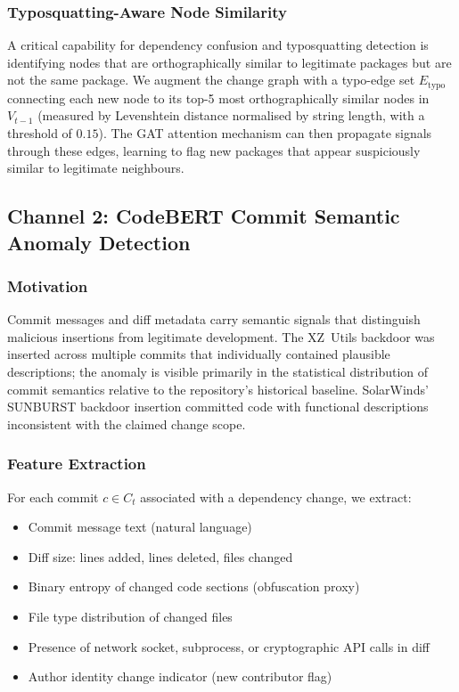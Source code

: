 \documentclass[sigconf,nonacm]{acmart}
\begin{document}
\subsubsection{Typosquatting-Aware Node Similarity}

A critical capability for dependency confusion and typosquatting detection is
identifying nodes that are orthographically similar to legitimate packages but
are not the same package. We augment the change graph with a typo-edge set
$E_\text{typo}$ connecting each new node to its top-5 most orthographically
similar nodes in $V_{t-1}$ (measured by Levenshtein distance normalised by
string length, with a threshold of $0.15$). The GAT attention mechanism can
then propagate signals through these edges, learning to flag new packages that
appear suspiciously similar to legitimate neighbours.

\subsection{Channel 2: CodeBERT Commit Semantic Anomaly Detection}

\subsubsection{Motivation}

Commit messages and diff metadata carry semantic signals that distinguish malicious
insertions from legitimate development. The XZ~Utils backdoor was inserted across
multiple commits that individually contained plausible descriptions; the anomaly
is visible primarily in the statistical distribution of commit semantics relative
to the repository's historical baseline. SolarWinds' SUNBURST backdoor insertion
committed code with functional descriptions inconsistent with the claimed change
scope.

\subsubsection{Feature Extraction}

For each commit $c \in C_t$ associated with a dependency change, we extract:
\begin{itemize}
  \item Commit message text (natural language)
  \item Diff size: lines added, lines deleted, files changed
  \item Binary entropy of changed code sections (obfuscation proxy)
  \item File type distribution of changed files
  \item Presence of network socket, subprocess, or cryptographic API calls in diff
  \item Author identity change indicator (new contributor flag)
\end{itemize}
\end{document}
